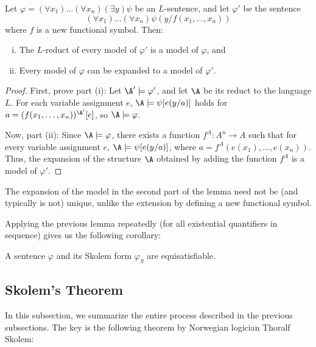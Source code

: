 \begin{lemma}\label{lemma:skolem-variant-conservative-extension}
Let $\varphi=(\forall x_1)\dots(\forall x_n)(\exists y)\psi$ be an $L$-sentence, and let $\varphi'$ be the sentence 
$$
(\forall x_1)\dots(\forall x_n)\psi(y/f(x_1,\dots,x_n))$$
where $f$ is a new functional symbol. Then:
\begin{enumerate}[(i)]
    \item The $L$-reduct of every model of $\varphi'$ is a model of $\varphi$, and 
    \item Every model of $\varphi$ can be expanded to a model of $\varphi'$.
\end{enumerate}
\end{lemma}

\begin{proof}
    First, prove part (i): Let $\A'\models\varphi'$, and let $\A$ be its reduct to the language $L$. For each variable assignment $e$, $\A\models\psi[e(y/a)]$ holds for $a=(f(x_1,\dots,x_n))^{\A'}[e]$, so $\A\models\varphi$.
    
    Now, part (ii): Since $\A\models\varphi$, there exists a function $f^A:A^n\to A$ such that for every variable assignment $e$, $\A\models \psi[e(y/a)]$, where $a=f^A(e(x_1),\dots,e(x_n))$. Thus, the expansion of the structure $\A$ obtained by adding the function $f^A$ is a model of $\varphi'$.    
\end{proof}

\begin{remark}
    The expansion of the model in the second part of the lemma need not be (and typically is not) unique, unlike the extension by defining a new functional symbol.
\end{remark}

Applying the previous lemma repeatedly (for all existential quantifiers in sequence) gives us the following corollary:

\begin{corollary}
    A sentence $\varphi$ and its Skolem form $\varphi_S$ are equisatisfiable.
\end{corollary}

\subsection{Skolem's Theorem}

In this subsection, we summarize the entire process described in the previous subsections. The key is the following theorem by Norwegian logician Thoralf Skolem:

